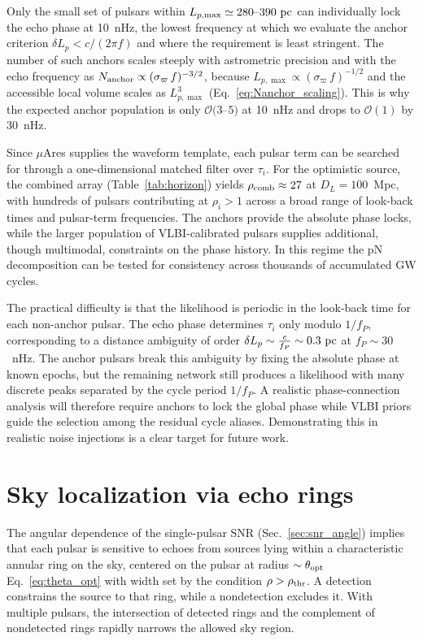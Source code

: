\documentclass[aps,prx,twocolumn,superscriptaddress,nofootinbib,longbibliography]{revtex4-2}
\begin{document}
Only the small set of pulsars within $ L_{p,\max} \simeq 280\text{--}390~{\rm pc}$ can individually lock the echo phase at 10~nHz, the lowest frequency at which we evaluate the anchor criterion $\delta L_p < c/(2\pi f)$ and where the requirement is least stringent. The number of such anchors scales steeply with astrometric precision and with the echo frequency as $N_{\rm anchor}\propto(\sigma_\varpi\,f)^{-3/2}$, because $L_{p,\max}\propto(\sigma_\varpi\,f)^{-1/2}$ and the accessible local volume scales as $L_{p,\max}^3$ (Eq.~\eqref{eq:Nanchor_scaling}). This is why the expected anchor population is only $\mathcal{O}(3$--$5)$ at 10~nHz and drops to $\mathcal{O}(1)$ by 30~nHz.

Since $\mu$Ares supplies the waveform template, each pulsar term can be searched for through a one-dimensional matched filter over $\tau_i$. For the optimistic source, the combined array (Table~\ref{tab:horizon}) yields $\rho_{\rm comb}\approx27$ at $D_L=100$~Mpc, with hundreds of pulsars contributing at $\rho_i>1$ across a broad range of look-back times and pulsar-term frequencies. The anchors provide the absolute phase locks, while the larger population of VLBI-calibrated pulsars supplies additional, though multimodal, constraints on the phase history. In this regime the pN decomposition can be tested for consistency across thousands of accumulated GW cycles.

The practical difficulty is that the likelihood is periodic in the look-back time for each non-anchor pulsar. The echo phase determines $\tau_i$ only modulo $1/f_P$, corresponding to a distance ambiguity of order $\delta L_p \sim \frac{c}{f_P} \sim 0.3~{\rm pc}$
at $f_P\sim30$~nHz. The anchor pulsars break this ambiguity by fixing the absolute phase at known epochs, but the remaining network still produces a likelihood with many discrete peaks separated by the cycle period $1/f_P$. A realistic phase-connection analysis will therefore require anchors to lock the global phase while VLBI priors guide the selection among the residual cycle aliases. Demonstrating this in realistic noise injections is a clear target for future work.


\section{Sky localization via echo rings}\label{sec:skyloc}

The angular dependence of the single-pulsar SNR (Sec.~\ref{sec:snr_angle}) implies that each pulsar is sensitive to echoes from sources lying within a characteristic annular ring on the sky, centered on the pulsar at radius $\sim\theta_{\rm opt}$ Eq.~\eqref{eq:theta_opt} with width set by the condition $\rho>\rho_{\rm thr}$. A detection constrains the source to that ring, while a nondetection excludes it. With multiple pulsars, the intersection of detected rings and the complement of nondetected rings rapidly narrows the allowed sky region.
\end{document}
